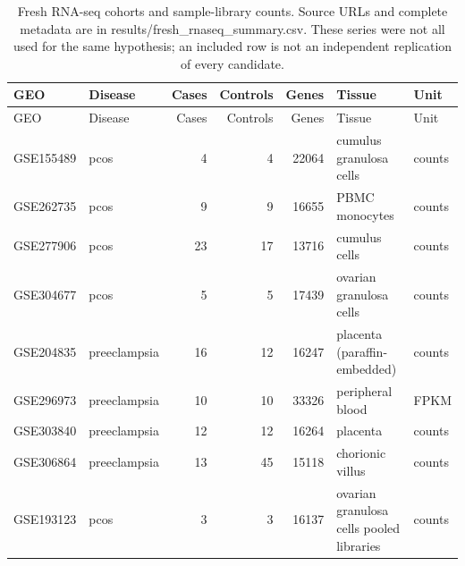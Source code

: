 \begin{longtable}{llrrrp{4.5cm}l}
\caption{Fresh RNA-seq cohorts and sample-library counts. Source URLs and complete metadata are in results/fresh\_rnaseq\_summary.csv. These series were not all used for the same hypothesis; an included row is not an independent replication of every candidate.}\label{tab:fresh}\\
\hline GEO & Disease & Cases & Controls & Genes & Tissue & Unit\\\hline\endfirsthead
\hline GEO & Disease & Cases & Controls & Genes & Tissue & Unit\\\hline\endhead
GSE155489 & pcos & 4 & 4 & 22064 & cumulus granulosa cells & counts\\
GSE262735 & pcos & 9 & 9 & 16655 & PBMC monocytes & counts\\
GSE277906 & pcos & 23 & 17 & 13716 & cumulus cells & counts\\
GSE304677 & pcos & 5 & 5 & 17439 & ovarian granulosa cells & counts\\
GSE204835 & preeclampsia & 16 & 12 & 16247 & placenta (paraffin-embedded) & counts\\
GSE296973 & preeclampsia & 10 & 10 & 33326 & peripheral blood & FPKM\\
GSE303840 & preeclampsia & 12 & 12 & 16264 & placenta & counts\\
GSE306864 & preeclampsia & 13 & 45 & 15118 & chorionic villus & counts\\
GSE193123 & pcos & 3 & 3 & 16137 & ovarian granulosa cells pooled libraries & counts\\
\hline\end{longtable}
